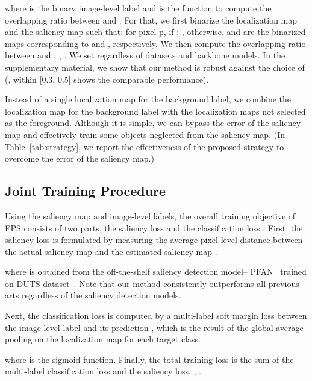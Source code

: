 \documentclass[final]{cvpr}
\begin{document}
\noindent where  is the binary image-level label and  is the function to compute the overlapping ratio between  and . For that, we first binarize the localization map and the saliency map such that: for pixel p,  if ; , otherwise.  and  are the binarized maps corresponding to  and , respectively. We then compute the overlapping ratio between  and , \ie, . We set  regardless of datasets and backbone models. In the supplementary material, we show that our method is robust against the choice of  (\ie,  within [0.3, 0.5] shows the comparable performance). 


Instead of a single localization map for the background label, we combine the localization map for the background label with the localization maps not selected as the foreground. Although it is simple, we can bypass the error of the saliency map and effectively train some objects neglected from the saliency map. (In Table~\ref{tab:strategy}, we report the effectiveness of the proposed strategy to overcome the error of the saliency map.)



\subsection{Joint Training Procedure}\label{section3.3}


Using the saliency map and image-level labels, the overall training objective of EPS consists of two parts, the saliency loss  and the classification loss . First, the saliency loss  is formulated by measuring the average pixel-level distance between the actual saliency map  and the estimated saliency map .
\vspace{-1mm}

\noindent where  is obtained from the off-the-shelf saliency detection model-- PFAN~\cite{zhao2019pyramid} trained on DUTS dataset~\cite{wang2017learning}. Note that our method consistently outperforms all previous arts regardless of the saliency detection models.


Next, the classification loss is computed by a multi-label soft margin loss between the image-level label  and its prediction , which is the result of the global average pooling on the localization map for each target class.
\vspace{-1mm}

\noindent where  is the sigmoid function. Finally, the total training loss is the sum of the multi-label classification loss and the saliency loss, \ie, . 
\end{document}
